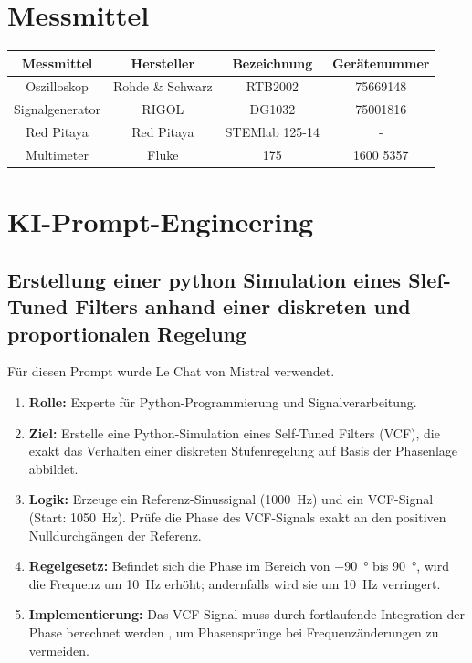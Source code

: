 \documentclass[a4paper,11pt]{book}
\begin{document}
\chapter{Messmittel}
\begin{table}[h]
    \centering
    \begin{tabular}{c|c|c|c}
        \textbf{Messmittel} & \textbf{Hersteller} & \textbf{Bezeichnung} & \textbf{Gerätenummer} \\ \hline
        Oszilloskop & Rohde \& Schwarz & RTB2002 & 75669148 \\
        Signalgenerator & RIGOL & DG1032 & 75001816 \\
        Red Pitaya & Red Pitaya & STEMlab 125-14 & - \\
        Multimeter & Fluke & 175 & 1600 5357 \\
    \end{tabular}
\end{table}





\newpage
\chapter{KI-Prompt-Engineering}

\section{Erstellung einer python Simulation eines Slef-Tuned Filters anhand einer diskreten und proportionalen Regelung}

Für diesen Prompt wurde Le Chat von Mistral verwendet. \par
\medskip

\begin{enumerate}
\item \textbf{Rolle:} Experte für Python-Programmierung und Signalverarbeitung.
\item \textbf{Ziel:} Erstelle eine Python-Simulation eines Self-Tuned Filters (VCF), die exakt das Verhalten einer diskreten Stufenregelung auf Basis der Phasenlage abbildet.
\item \textbf{Logik:} Erzeuge ein Referenz-Sinussignal (\SI{1000}{\hertz}) und ein VCF-Signal (Start: \SI{1050}{\hertz}). Prüfe die Phase des VCF-Signals exakt an den positiven Nulldurchgängen der Referenz.
\item \textbf{Regelgesetz:} Befindet sich die Phase im Bereich von \SI{-90}{\degree} bis \SI{90}{\degree}, wird die Frequenz um \SI{10}{\hertz} erhöht; andernfalls wird sie um \SI{10}{\hertz} verringert.
\item \textbf{Implementierung:} Das VCF-Signal muss durch fortlaufende Integration der Phase berechnet werden , um Phasensprünge bei Frequenzänderungen zu vermeiden.
\end{enumerate}
\end{document}
